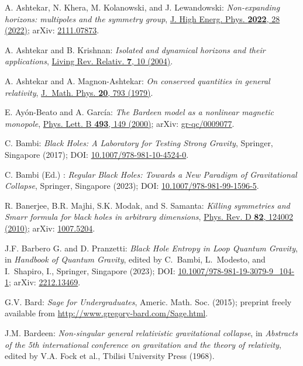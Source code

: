 \begin{thebibliography}{123}
A. Ashtekar, N. Khera, M. Kolanowski, and J. Lewandowski:
{\em Non-expanding horizons: multipoles and the symmetry group},
\href{https://doi.org/10.1007/JHEP01(2022)028}{J. High Energ. Phys. {\bf 2022}, 28 (2022)};
arXiv: \href{https://arxiv.org/abs/2111.07873}{2111.07873}.

A. Ashtekar and B. Krishnan: {\em Isolated and dynamical horizons
and their applications},
\href{https://doi.org/10.12942/lrr-2004-10}{Living Rev. Relativ. {\bf 7}, 10 (2004)}.

A. Ashtekar and A. Magnon-Ashtekar:
{\em On conserved quantities in general relativity},
\href{https://doi.org/10.1063/1.524151}{J.~Math. Phys. {\bf 20}, 793 (1979)}.

E. Ayón-Beato and A. García:
{\em The Bardeen model as a nonlinear magnetic monopole},
\href{https://doi.org/10.1016/S0370-2693(00)01125-4}{Phys. Lett. B {\bf 493}, 149 (2000)};
arXiv: \href{https://arxiv.org/abs/gr-qc/0009077}{gr-qc/0009077}.

C. Bambi: {\em Black Holes: A Laboratory for Testing Strong Gravity},
Springer, Singapore (2017);
DOI: \href{https://doi.org/10.1007/978-981-10-4524-0}{10.1007/978-981-10-4524-0}.

C. Bambi (Ed.) : {\em Regular Black Holes: Towards a New Paradigm of Gravitational Collapse},
Springer, Singapore (2023);
DOI: \href{https://doi.org/10.1007/978-981-99-1596-5}{10.1007/978-981-99-1596-5}.

R. Banerjee, B.R. Majhi, S.K. Modak, and S. Samanta:
{\em Killing symmetries and Smarr formula for black holes in arbitrary dimensions},
\href{https://doi.org/10.1103/PhysRevD.82.124002}{Phys. Rev. D {\bf 82}, 124002 (2010)};
arXiv: \href{https://arxiv.org/abs/1007.5204}{1007.5204}.

J.F. Barbero G. and D. Pranzetti:
{\em Black Hole Entropy in Loop Quantum Gravity},
in {\em Handbook of Quantum Gravity}, edited by C.~Bambi, L.~Modesto, and I.~Shapiro, I.,
Springer, Singapore (2023);
DOI: \href{https://doi.org/10.1007/978-981-19-3079-9_104-1}{10.1007/978-981-19-3079-9\_104-1};
arXiv: \href{https://arxiv.org/abs/2212.13469}{2212.13469}.

G.V. Bard: {\em Sage for Undergraduates}, Americ. Math. Soc. (2015);
preprint freely available from \url{http://www.gregory-bard.com/Sage.html}.

J.M. Bardeen:
{\em Non-singular general relativistic gravitational collapse},
in \emph{Abstracts of the 5th international conference on gravitation and the theory of relativity}, edited by V.A. Fock et al., Tbilisi University Press (1968).


\end{thebibliography}
